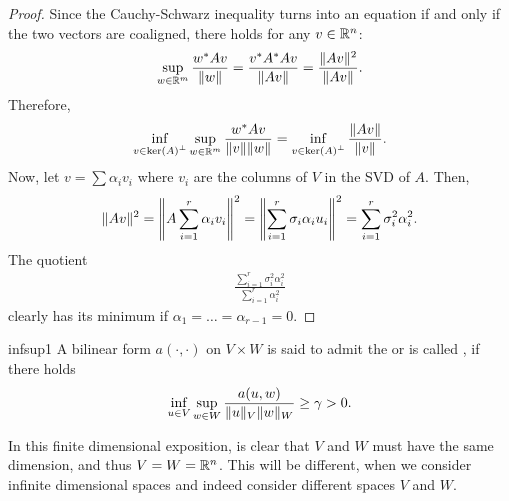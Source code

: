 \begin{proof}
  Since the Cauchy-Schwarz inequality turns into an equation if and
  only if the two vectors are coaligned, there holds for any $v\in \R^n$:
  \begin{gather}
    \sup_{w\in\R^m}\frac{w^\transpose A v}{\norm{w}} = \frac{v^\transpose A^\transpose A v}{\norm{Av}} = \frac{\norm{Av}^2}{\norm{Av}}.
  \end{gather}
  Therefore,
  \begin{gather}
    \inf_{v\in \ortho{\ker A}} \sup_{w\in \R^m}
    \frac{w^\transpose A v}{\norm{v}\norm{w}}
    = \inf_{v\in \ortho{\ker A}} \frac{\norm{Av}}{\norm{v}}.
  \end{gather}
  Now, let $v = \sum \alpha_i v_i$ where $v_i$ are the columns of $V$
  in the SVD of $A$. Then,
  \begin{gather}
    \norm{Av}^2 = \norm*{A\sum_{i=1}^r \alpha_i v_i}^2
    = \norm*{\sum_{i=1}^r \sigma_i \alpha_i u_i}^2
    = \sum_{i=1}^r \sigma_i^2 \alpha_i^2.
  \end{gather}
  The quotient
  \begin{gather}
    \frac{\sum_{i=1}^r \sigma_i^2 \alpha_i^2}{\sum_{i=1}^r \alpha_i^2}
  \end{gather}
  clearly has its minimum if $\alpha_1 = \dots=\alpha_{r-1} = 0$.
\end{proof}

\begin{Definition}{infsup1}
  A bilinear form $a(\cdot,\cdot)$ on $V\times W$ is said to admit the
   or is called , if
  there holds
  \begin{gather}
    \label{eq:infsup:1}
    \inf_{u\in V} \sup_{w\in W} \frac{a(u,w)}{\norm{u}_V\norm{w}_W}
    \ge \ellipa > 0.
  \end{gather}
\end{Definition}

\begin{remark}
  In this finite dimensional exposition, is clear that $V$ and $W$
  must have the same dimension, and thus $V=W=\R^n$. This will be
  different, when we consider infinite dimensional spaces and indeed
  consider different spaces $V$ and $W$.
\end{remark}

